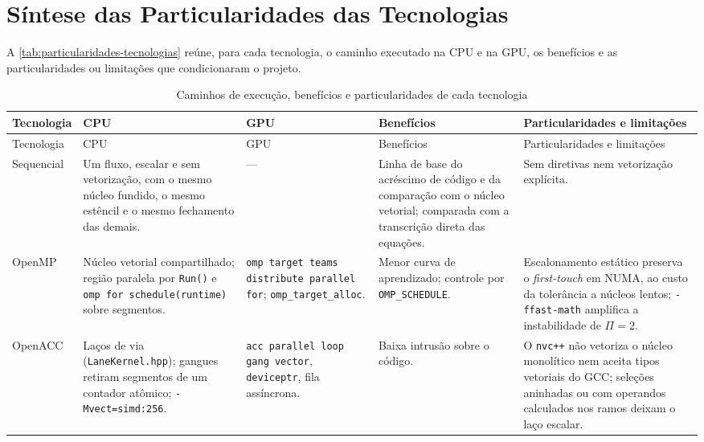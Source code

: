\section{Síntese das Particularidades das Tecnologias}\label{sec:sintese-particularidades}

A \autoref{tab:particularidades-tecnologias} reúne, para cada tecnologia, o caminho executado na CPU e na GPU, os benefícios e as particularidades ou limitações que condicionaram o projeto.

{\footnotesize
\begin{longtable}{>{\raggedright\arraybackslash}p{1.7cm}>{\raggedright\arraybackslash}p{3.0cm}>{\raggedright\arraybackslash}p{2.7cm}>{\raggedright\arraybackslash}p{2.6cm}>{\raggedright\arraybackslash}p{3.7cm}}
    \caption{Caminhos de execução, benefícios e particularidades de cada tecnologia}\label{tab:particularidades-tecnologias} \\
    \toprule
    Tecnologia & CPU & GPU & Benefícios & Particularidades e limitações \\
    \midrule
    \endfirsthead
    \toprule
    Tecnologia & CPU & GPU & Benefícios & Particularidades e limitações \\
    \midrule
    \endhead
    \bottomrule
    \endlastfoot
    Sequencial &
        Um fluxo, escalar e sem vetorização, com o mesmo núcleo fundido, o mesmo estêncil e o mesmo fechamento das demais. &
        --- &
        Linha de base do acréscimo de código e da comparação com o núcleo vetorial; comparada com a transcrição direta das equações. &
        Sem diretivas nem vetorização explícita. \\
    OpenMP &
        Núcleo vetorial compartilhado; região paralela por \texttt{Run()} e \texttt{omp for schedule(\allowbreak runtime)} sobre segmentos. &
        \texttt{omp target teams distribute parallel for}; \texttt{omp\_\allowbreak target\_\allowbreak alloc}. &
        Menor curva de aprendizado; controle por \texttt{OMP\_SCHEDULE}. &
        Escalonamento estático preserva o \textit{first-touch} em NUMA, ao custo da tolerância a núcleos lentos; \texttt{-ffast-math} amplifica a instabilidade de $\Pi = 2$. \\
    OpenACC &
        Laços de via (\texttt{Lane\allowbreak Kernel.hpp}); gangues retiram segmentos de um contador atômico; \texttt{-Mvect=simd:256}. &
        \texttt{acc parallel loop gang vector}, \texttt{deviceptr}, fila assíncrona. &
        Baixa intrusão sobre o código. &
        O \texttt{nvc++} não vetoriza o núcleo monolítico nem aceita tipos vetoriais do GCC; seleções aninhadas ou com operandos calculados nos ramos deixam o laço escalar. \\

\end{longtable}}
